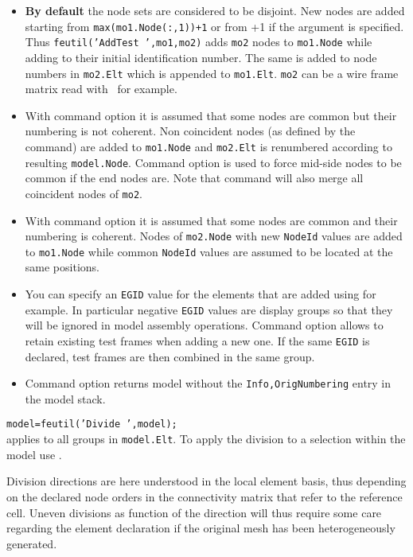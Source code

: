 \begin{itemize}
\item {\bf By default} the node sets are considered to be disjoint. New nodes are added starting from {\tt max(mo1.Node(:,1))+1} or from +1 if the argument is specified. \texline Thus {\tt feutil('AddTest ',mo1,mo2)} adds {\tt mo2} nodes  to {\tt mo1.Node} while adding  to their initial identification number. The same  is added to node numbers in {\tt mo2.Elt} which is appended to {\tt mo1.Elt}. {\tt mo2} can be a wire frame matrix read with \ufread\ for example.
\item With command option  it is assumed that some nodes are common but their numbering is not coherent. Non coincident nodes (as defined by the  command) are added to {\tt mo1.Node} and {\tt mo2.Elt} is renumbered according to resulting {\tt model.Node}. Command option  is used to force mid-side nodes to be common if the end nodes are. Note that command  will also merge all coincident nodes of {\tt mo2}.
\item With command option  it is assumed that some nodes are common and their numbering is coherent. Nodes of {\tt mo2.Node} with new {\tt NodeId} values are added to {\tt mo1.Node} while common {\tt NodeId} values are assumed to be located at the same positions.
\item You can specify an {\tt EGID} value for the elements that are added using  for example. In particular negative {\tt EGID} values are display groups so that they will be ignored in model assembly operations. Command option  allows to retain existing test frames when adding a new one. If the same {\tt EGID} is declared, test frames are then combined in the same group.
\item Command option  returns model without the {\tt Info,OrigNumbering} entry in the model stack.
\end{itemize}

{\tt model=feutil('Divide ',model);}\\
 applies to all groups in {\tt model.Elt}. To apply the division to a selection within the model use . 

Division directions  are here understood in the local element basis, thus depending on the declared node orders in the connectivity matrix that refer to the reference cell. Uneven divisions as function of the direction will thus require some care regarding the element declaration if the original mesh has been heterogeneously generated.

